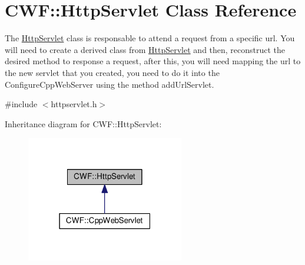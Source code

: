 \hypertarget{class_c_w_f_1_1_http_servlet}{\section{C\+W\+F\+:\+:Http\+Servlet Class Reference}
\label{class_c_w_f_1_1_http_servlet}
}


The \hyperlink{class_c_w_f_1_1_http_servlet}{Http\+Servlet} class is responsable to attend a request from a specific url. You will need to create a derived class from \hyperlink{class_c_w_f_1_1_http_servlet}{Http\+Servlet} and then, reconstruct the desired method to response a request, after this, you will need mapping the url to the new servlet that you created, you need to do it into the Configure\+Cpp\+Web\+Server using the method add\+Url\+Servlet.  




{\ttfamily \#include $<$httpservlet.\+h$>$}



Inheritance diagram for C\+W\+F\+:\+:Http\+Servlet\+:\nopagebreak
\begin{figure}[H]
\begin{center}
\leavevmode
\includegraphics[width=195pt]{class_c_w_f_1_1_http_servlet__inherit__graph}
\end{center}
\end{figure}
